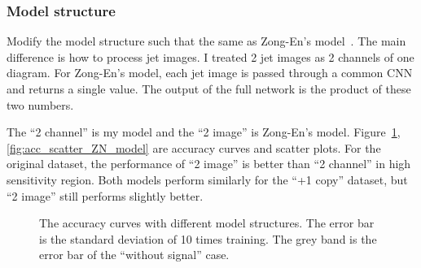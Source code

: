 \documentclass[12pt]{article}
\begin{document}
		\subsubsection{Model structure}%
		\label{subs:model_structure}
			Modify the model structure such that the same as Zong-En's model~\cite{Beauchesne:2023vie}. The main difference is how to process jet images. I treated 2 jet images as 2 channels of one diagram. For Zong-En's model, each jet image is passed through a common CNN and returns a single value. The output of the full network is the product of these two numbers.

			The ``2 channel'' is my model and the ``2 image'' is Zong-En's model. Figure~\ref{fig:acc_curve_ZN_model}, \ref{fig:acc_scatter_ZN_model} are accuracy curves and scatter plots. For the original dataset, the performance of ``2 image'' is better than ``2 channel'' in high sensitivity region. Both models perform similarly for the ``+1 copy'' dataset, but ``2 image'' still performs slightly better.
			\begin{figure}[htpb]
				\centering
				\caption{The accuracy curves with different model structures. The error bar is the standard deviation of 10 times training. The grey band is the error bar of the ``without signal'' case.}
				\label{fig:acc_curve_ZN_model}
			\end{figure}
\end{document}
